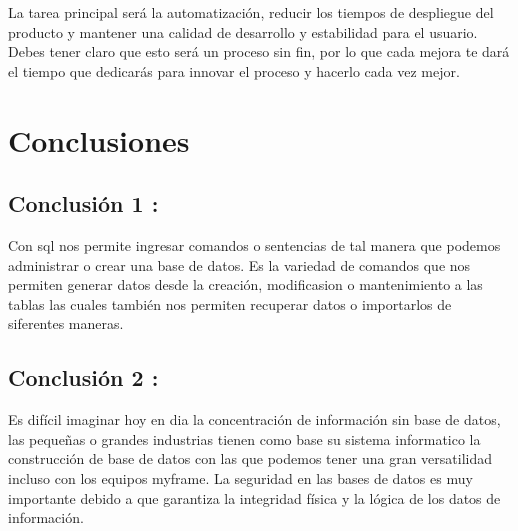 \documentclass[preprint,12pt]{elsarticle}
\begin{document}
La tarea principal será la automatización, reducir los tiempos de despliegue del producto y mantener una calidad de desarrollo y estabilidad para el usuario. Debes tener claro que esto será un proceso sin fin, por lo que cada mejora te dará el tiempo que dedicarás para innovar el proceso y hacerlo cada vez mejor.


\section{Conclusiones}

\subsection{Conclusión 1 : }	
Con sql nos permite ingresar comandos o sentencias de tal manera que podemos administrar o crear una base de datos.
Es la variedad de comandos que nos permiten generar datos desde la creación, modificasion o mantenimiento a las tablas las cuales también nos permiten recuperar datos o importarlos de siferentes maneras.

\subsection{Conclusión 2 : }	
Es difícil imaginar hoy en dia la concentración de información sin base de datos, las pequeñas o grandes industrias tienen como base su sistema informatico la construcción de base de datos con las que podemos tener una gran versatilidad incluso con los equipos myframe.
La seguridad en las bases de datos es muy importante debido a que garantiza la integridad física y la lógica de los datos de información.


	
	

	
	\newpage
	
		 
\citep{DLake01}  
\citep{DLake02}  
\citep{DWarehouse01}  
\citep{DWarehouse02}   
	
\end{document}

